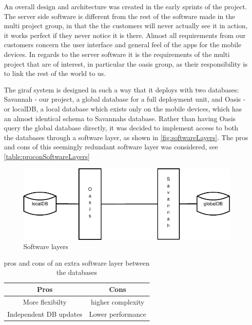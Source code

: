 An overall design and architecture was created in the early sprints of the project.
The server side software is different from the rest of the software made in the multi project group, in that the the customers will never actually see it in action, it works perfect if they never notice it is there.
Almost all requirements from our customers concern the user interface and general feel of the apps for the mobile devices. In regards to the server software it is the requirements of the multi project that are of interest,
in particular the oasis group, as their responsibility is to link the rest of the world to us.

The giraf system is designed in such a way that it deploys with two databases: Savannah - our project, a global database for a full deployment unit, and Oasis - or localDB, a local database which exists only
on the mobile devices, which has an almost identical schema to Savannahs database.
Rather than having Oasis query the global database directly, it was decided to implement access to both the databases through a software layer, as shown in \autoref{fig:softwareLayers}.
The pros and cons of this seemingly redundant software layer was considered, see \autoref{table:proconSoftwareLayers}

\begin{figure}[H]
	\centering
		\includegraphics[scale=1]{images/softwareLayers}
	\caption{Software layers}
	\label{fig:softwareLayers}
\end{figure}

\begin{table}[H]
  \begin{center}
    \begin{tabular}{c|c}
    Pros                   &             Cons \\
    \hline
    More flexibilty        & higher complexity\\
    Independent DB updates & Lower performance\\
    \end{tabular}
    \caption{pros and cons of an extra software layer between the databases}
    \label{table:proconSoftwareLayers}
  \end{center}
\end{table}

